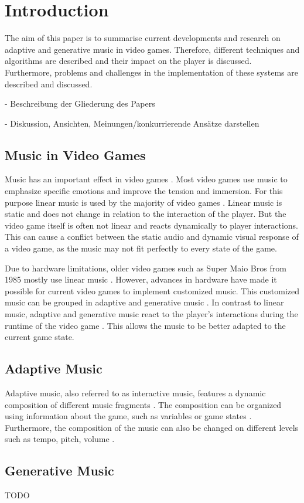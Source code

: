 \section{Introduction}
The aim of this paper is to summarise current developments and research on adaptive and generative music in video games. Therefore, different techniques and algorithms are described and their impact on the player is discussed. Furthermore, problems and challenges in the implementation of these systems are described and discussed.

- Beschreibung der Gliederung des Papers

- Diskussion, Ansichten, Meinungen/konkurrierende Ansätze darstellen


\subsection{Music in Video Games}
Music has an important effect in video games \cite{fu2015backgroundmusic}. Most video games use music to emphasize specific emotions and improve the tension and immersion. For this purpose linear music is used by the majority of video games \cite{prechtl2016adaptive}. Linear music is static and does not change in relation to the interaction of the player. But the video game itself is often not linear and reacts dynamically to player interactions. This can cause a conflict between the static audio and dynamic visual response of a video game, as the music may not fit perfectly to every state of the game.  

Due to hardware limitations, older video games such as Super Maio Bros from 1985 \cite{supermariobros1985} mostly use linear music \cite{plut2020generative}. However, advances in hardware have made it possible for current video games to implement customized music. This customized music can be grouped in adaptive and generative music \cite{plut2020generative}. In contrast to linear music, adaptive and generative music react to the player's interactions during the runtime of the video game \cite{plut2020generative}. This allows the music to be better adapted to the current game state.

\subsection{Adaptive Music}
Adaptive music, also referred to as interactive music, features a dynamic composition of different music fragments \cite{plut2020generative} \cite{hutMcCormAms} \cite{amaral2022adaptive}.
The composition can be organized using information about the game, such as variables or game states \cite{plut2020generative}. 
Furthermore, the composition of the music can also be changed on different levels such as tempo, pitch, volume \cite{plut2020generative} \cite{amaral2022adaptive}.

\subsection{Generative Music}
TODO
